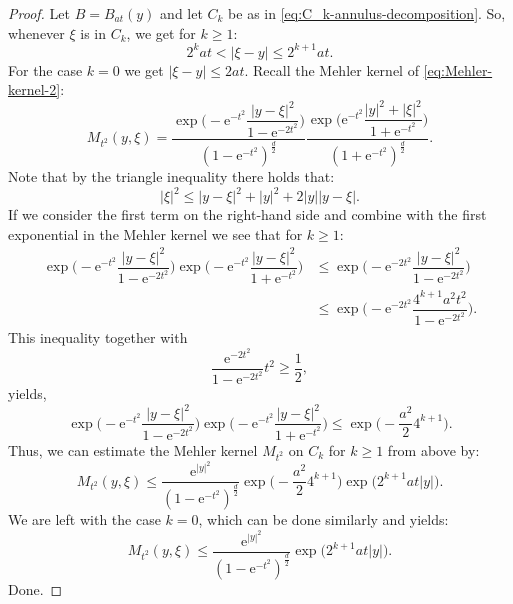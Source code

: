 \documentclass[a4paper,oneside,10pt]{amsproc}
\theoremstyle{plain}
\theoremstyle{remark}
\theoremstyle{definition}
\renewcommand{\leq}{\leqslant}
\renewcommand{\leq}{\leqslant}
\renewcommand{\geq}{\geqslant}
\newcommand{\e}{\mathrm{e}} %
\renewcommand{\leq}{\leqslant} %
\renewcommand{\geq}{\geqslant} %
\begin{document}
\begin{proof}
  Let $B = B_{at}(y)$ and let $C_k$ be as in \eqref{eq:C_k-annulus-decomposition}.
  So, whenever $\xi$ is in $C_k$, we get for $k \geq 1$:
  \begin{equation*}
    2^k a t < |\xi - y| \leq 2^{k + 1} a t.
  \end{equation*}
  For the case $k = 0$ we get $|\xi - y| \leq 2 a t$.
  Recall the Mehler kernel of \eqref{eq:Mehler-kernel-2}:
  \begin{equation*}
    M_{t^2}(y, \xi) = \frac{\exp\biggl(-\e^{-t^2} \dfrac{|y - \xi|^2}{1
        - \e^{-2t^2}}  \biggr)}{(1 - \e^{-t^2})^{\frac{d}2}}
    \frac{\exp\biggl(\e^{-t^2} \dfrac{|y|^2 + |\xi|^2}{1 + \e^{-t^2}}
      \biggr)}{(1 + \e^{-t^2})^{\frac{d}2}}.
  \end{equation*}
  Note that by the triangle inequality there holds that:
  \begin{equation*}
    |\xi|^2 \leq |y - \xi|^2 + |y|^2 + 2 |y||y - \xi|.
  \end{equation*}
  If we consider the first term on the right-hand side and combine
  with the first exponential in the Mehler kernel we see that for $k
  \geq 1$:
  \begin{align*}
    \exp\biggl(-\e^{-t^2} \dfrac{|y - \xi|^2}{1 - \e^{-2t^2}}  \biggr)
    \exp\biggl(-\e^{-t^2} \dfrac{|y - \xi|^2}{1 + \e^{-t^2}}  \biggr)
    &\leq \exp\biggl(-\e^{-2t^2} \dfrac{|y - \xi|^2}{1 - \e^{-2t^2}}
    \biggr)\\
    &\leq \exp\biggl(-\e^{-2t^2} \dfrac{4^{k + 1} a^2 t^2}{1 - \e^{-2t^2}}
    \biggr).
  \end{align*}
  This inequality together with
  \begin{equation*}
    \frac{\e^{-2t^2}}{1 - \e^{-2t^2}} t^2 \geq \frac12,
  \end{equation*}
  yields,
    \begin{equation*}
    \exp\biggl(-\e^{-t^2} \dfrac{|y - \xi|^2}{1 - \e^{-2t^2}}  \biggr)
    \exp\biggl(-\e^{-t^2} \dfrac{|y - \xi|^2}{1 + \e^{-t^2}}  \biggr)
    \leq \exp\biggl(-\dfrac{a^2}{2} 4^{k + 1} \biggr).
  \end{equation*}
  Thus, we can estimate the Mehler kernel $M_{t^2}$ on $C_k$ for $k
  \geq 1$ from above by:
  \begin{equation*}
    M_{t^2}(y, \xi) \leq \frac{\e^{|y|^2}}{(1 - \e^{-t^2})^{\frac{d}2}}
    \exp\biggl(-\frac{a^2}{2} 4^{k + 1} \biggr) \exp\bigl(2^{k + 1} a t |y|
    \bigr).
  \end{equation*}
  We are left with the case $k = 0$, which can be done similarly and
  yields:
  \begin{equation*}
    M_{t^2}(y, \xi) \leq \frac{\e^{|y|^2}}{(1 - \e^{-t^2})^{\frac{d}2}}
    \exp\bigl(2^{k + 1} a t |y| \bigr).
  \end{equation*}
  Done.
\end{proof}


\printbibliography
\end{document}
